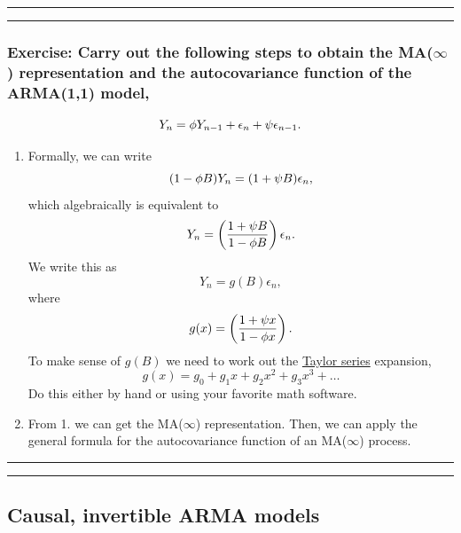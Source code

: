 \documentclass[]{article}
\begin{document}
\begin{center}\rule{0.5\linewidth}{\linethickness}\end{center}

\begin{center}\rule{0.5\linewidth}{\linethickness}\end{center}

\subsubsection{\texorpdfstring{Exercise: Carry out the following steps
to obtain the MA(\(\infty\)) representation and the autocovariance
function of the ARMA(1,1)
model,}{Exercise: Carry out the following steps to obtain the MA(\textbackslash{}infty) representation and the autocovariance function of the ARMA(1,1) model,}}\label{exercise-carry-out-the-following-steps-to-obtain-the-mainfty-representation-and-the-autocovariance-function-of-the-arma11-model}

\[ Y_n = \phi Y_{n-1} + \epsilon_n + \psi \epsilon_{n-1}.\]
\begin{enumerate}
\def\labelenumi{\arabic{enumi}.}
\item
  Formally, we can write \[   (1-\phi B)Y_n = (1+\psi B)\epsilon_n,\]
  which algebraically is equivalent to
  \[Y_n = \left(\frac{1+\psi B}{1-\phi B}\right)\epsilon_n.\] We write
  this as \[Y_n = g(B) \epsilon_n,\] where
  \[ g(x) = \left(\frac{1+\psi x}{1-\phi x}\right).\] To make sense of
  \(g(B)\) we need to work out the
  \href{https://en.wikipedia.org/wiki/Taylor_series}{Taylor series}
  expansion, \[g(x) = g_0 + g_1 x + g_2 x^2 + g_3 x^3 + \dots\] Do this
  either by hand or using your favorite math software.
\item
  From 1. we can get the MA(\(\infty\)) representation. Then, we can
  apply the general formula for the autocovariance function of an
  MA(\(\infty\)) process.
\end{enumerate}

\begin{center}\rule{0.5\linewidth}{\linethickness}\end{center}

\begin{center}\rule{0.5\linewidth}{\linethickness}\end{center}

\subsection{Causal, invertible ARMA
models}\label{causal-invertible-arma-models}
\end{document}
